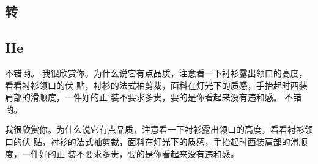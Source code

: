 \documentclass{LZUthesis}
\begin{document}
\subsection{转}
\subsection{He}

\backmatter
{}%
\printbib



\Appendix
不错哟。
\Appendix
我很欣赏你。为什么说它有点品质，注意看一下衬衫露出领口的高度，看看衬衫领口的伏
贴，衬衫的法式袖剪裁，面料在灯光下的质感，\cite{silva2013brain}手抬起时西装肩部的滑顺度，一件好的正
装不要求多贵，要的是你看起来没有违和感。%
\Thanks
不错哟。

我很欣赏你。为什么说它有点品质，注意看一下衬衫露出领口的高度，看看衬衫领口的伏
贴，衬衫的法式袖剪裁，面料在灯光下的质感，手抬起时西\cite{frank2007hold}装肩部的滑顺度，一件好的正
装不要求多贵，要的是你看起来没有违和感。%
\renewcommand{\supervisorcomment}{%
不错哟。

我很欣赏你。为什么说它有点品质，注意看一下衬衫露出领口的高度，看看衬衫领口的伏
贴，衬衫的法式袖剪裁，面料在灯光下的质感，手抬起时西装肩部的滑顺度，一件好的正
装不要求多贵，要的是你看起来没有违和感。%
}
\renewcommand{\recommendedgrade}{97}
\renewcommand{\supervisorsignature}{%
    \raisebox{-10pt}{%
        \texttt{[image: signature.pdf]}%
    }%
}
\renewcommand{\committeecomment}{不错}
\renewcommand{\finalgrade}{100}

\Grade
\end{document}
